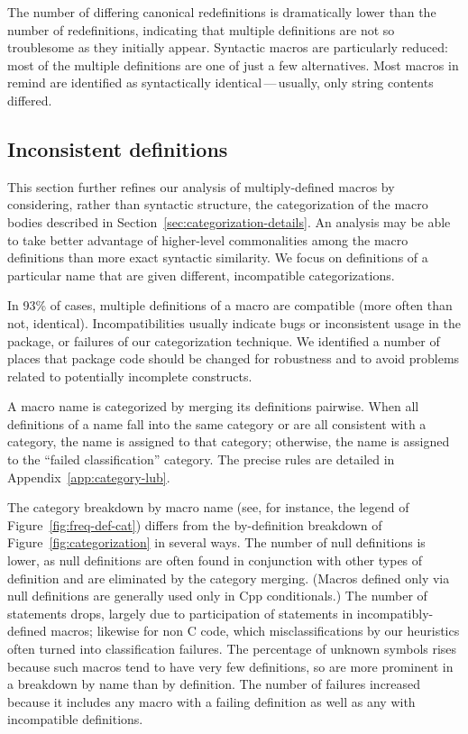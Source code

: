 \documentclass[10pt]{article}
\newcommand{\pkg}[1]{\textsf{#1}}
\begin{document}
The number of differing canonical redefinitions is dramatically lower than
the number of redefinitions, indicating that multiple definitions are not
so troublesome as they initially appear.  Syntactic macros are particularly
reduced: most of the multiple definitions are one of just a few
alternatives.  Most macros in \pkg{remind} are identified as syntactically
identical\,---\,usually, only string contents differed.


\subsection{Inconsistent definitions}
\label{sec:inconsistent}


This section further refines our analysis of multiply-defined macros by
considering, rather than syntactic structure, the categorization of the
macro bodies described in Section~\ref{sec:categorization-details}.  An
analysis may be able to take better advantage of higher-level commonalities
among the macro definitions than more exact syntactic similarity.  We focus
on definitions of a particular name that are given different, incompatible
categorizations.


In 93\% of cases, multiple definitions of a macro are compatible (more
often than not, identical).  Incompatibilities usually indicate bugs or
inconsistent usage in the package, or failures of our categorization
technique.  We identified a number of places that package code should be
changed for robustness and to avoid problems related to potentially
incomplete constructs.

A macro name is categorized by merging its definitions pairwise.  When all
definitions of a name fall into the same category or are all consistent
with a category, the name is assigned to that category; otherwise, the name
is assigned to the ``failed classification'' category.  The precise rules
are detailed in Appendix~\ref{app:category-lub}.

The category breakdown by macro name (see, for instance, the legend of
Figure~\ref{fig:freq-def-cat}) differs from the by-definition breakdown of
Figure~\ref{fig:categorization} in several ways.  The number of null
definitions is lower, as null definitions are often found in conjunction
with other types of definition and are eliminated by the category merging.
(Macros defined only via null definitions are generally used only in Cpp
conditionals.)  The number of statements drops, largely due to
participation of statements in incompatibly-defined macros; likewise for
non C code, which misclassifications by our heuristics often turned into
classification failures.  The percentage of unknown symbols rises because
such macros tend to have very few definitions, so are more prominent in a
breakdown by name than by definition.  The number of failures increased
because it includes any macro with a failing definition as well as any with
incompatible definitions.
\end{document}
